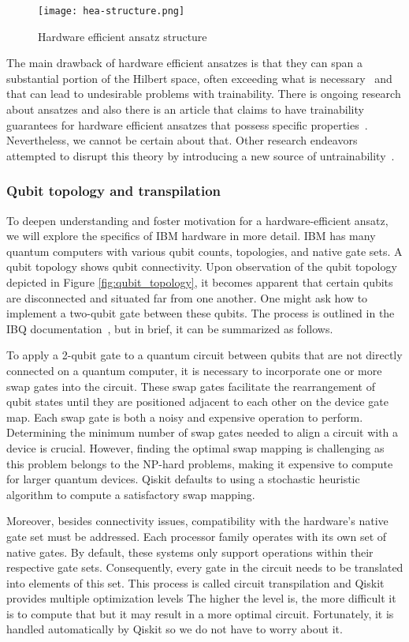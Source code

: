 \begin{figure}[H]
    \centering
    \texttt{[image: hea-structure.png]}       
    \caption{Hardware efficient ansatz structure~\cite{img:hea}}     
\end{figure}
The main drawback of hardware efficient ansatzes is that they can span a substantial portion of the Hilbert space, often exceeding what is necessary~\cite{holmes2022} and that can lead to undesirable problems with trainability. There is ongoing research about ansatzes and also there is an article that claims to have trainability guarantees for hardware efficient ansatzes that possess specific properties~\cite{shallow}. Nevertheless, we cannot be certain about that. Other research endeavors attempted to disrupt this theory by introducing a new source of untrainability~\cite{hea-practical}.

\subsubsection{Qubit topology and transpilation}
To deepen understanding and foster motivation for a hardware-efficient ansatz, we will explore the specifics of IBM hardware in more detail. IBM has many quantum computers with various qubit counts, topologies, and native gate sets. A qubit topology shows qubit connectivity. Upon observation of the qubit topology depicted in Figure \ref{fig:qubit_topology}, it becomes apparent that certain qubits are disconnected and situated far from one another. One might ask how to implement a two-qubit gate between these qubits. The process is outlined in the IBQ documentation~\cite{transpiler,native_gates}, but in brief, it can be summarized as follows.

To apply a 2-qubit gate to a quantum circuit between qubits that are not directly connected on a quantum computer, it is necessary to incorporate one or more swap gates into the circuit. These swap gates facilitate the rearrangement of qubit states until they are positioned adjacent to each other on the device gate map. Each swap gate is both a noisy and expensive operation to perform. Determining the minimum number of swap gates needed to align a circuit with a device is crucial. However, finding the optimal swap mapping is challenging as this problem belongs to the NP-hard problems, making it expensive to compute for larger quantum devices. Qiskit defaults to using a stochastic heuristic algorithm to compute a satisfactory swap mapping.

Moreover, besides connectivity issues, compatibility with the hardware's native gate set must be addressed. Each processor family operates with its own set of native gates. By default, these systems only support operations within their respective gate sets. Consequently, every gate in the circuit needs to be translated into elements of this set. This process is called circuit transpilation and Qiskit provides multiple optimization levels The higher the level is, the more difficult it is to compute that but it may result in a more optimal circuit. Fortunately, it is handled automatically by Qiskit so we do not have to worry about it. 

